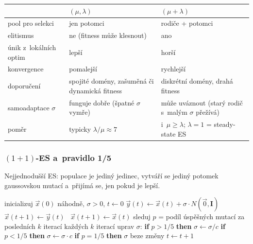 \documentclass[11pt,a4paper]{article}
\theoremstyle{definition}
\begin{document}
\begin{center}
\begin{tabular}{@{}p{4cm}p{5.5cm}p{5.5cm}@{}}
\toprule
 & $(\mu,\lambda)$ & $(\mu+\lambda)$ \\
\midrule
pool pro selekci & jen potomci & rodiče + potomci \\
elitismus & ne (fitness může klesnout) & ano \\
únik z~lokálních optim & lepší & horší \\
konvergence & pomalejší & rychlejší \\
doporučení & spojité domény, zašuměná či dynamická fitness & diskrétní domény,
  drahá fitness \\
samoadaptace $\sigma$ & funguje dobře (špatné $\sigma$ vymře) & může uváznout
  (starý rodič s~malým $\sigma$ přežívá) \\
poměr & typicky $\lambda/\mu \approx 7$ & i~$\mu \ge \lambda$; $\lambda = 1$ =
  steady-state ES \\
\bottomrule
\end{tabular}
\end{center}

\subsubsection{$(1+1)$-ES a~pravidlo 1/5}

Nejjednodušší ES: populace je jediný jedinec, vytváří se jediný potomek
gaussovskou mutací a~přijímá se, jen pokud je lepší.

\begin{algorithm}[!ht]
\caption{$(1+1)$-ES s~pravidlem 1/5 (minimalizace $f:\mathbb{R}^n \to \mathbb{R}$)}
\begin{algorithmic}[1]
\State inicializuj $\vec x(0)$ náhodně, $\sigma > 0$, $t \gets 0$
\Repeat
  \State $\vec y(t) \gets \vec x(t) + \sigma \cdot N(\vec 0, \mathbf{I})$
   $\vec x(t+1) \gets \vec y(t)$
  \Else\ $\vec x(t+1) \gets \vec x(t)$
  \EndIf
  \State sleduj $p$ = podíl úspěšných mutací za posledních $k$ iterací
  \State každých $k$ iterací uprav $\sigma$:
  \State \quad \textbf{if} $p > 1/5$ \textbf{then} $\sigma \gets \sigma / c$
  \State \quad \textbf{if} $p < 1/5$ \textbf{then} $\sigma \gets \sigma \cdot c$
  \State \quad \textbf{if} $p = 1/5$ \textbf{then} $\sigma$ beze změny
  \State $t \gets t+1$
\end{algorithmic}
\end{algorithm}
\end{document}

